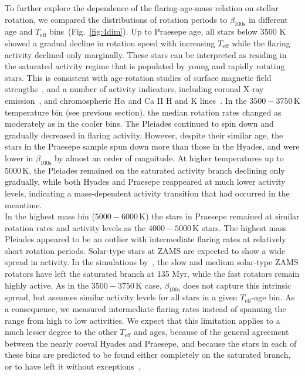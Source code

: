 \documentclass{aa}
\begin{document}
To further explore the dependence of the flaring-age-mass relation on stellar rotation, we compared the distributions of rotation periods to $\beta_\mathrm{100s}$ in different age and $T_\mathrm{eff}$ bins~(Fig.~\ref{fig:4dim}). Up to Praesepe age, all stars below 3500 K showed a gradual decline in rotation speed with increasing $T_\mathrm{eff}$ while the flaring activity declined only marginally. These stars can be interpreted as residing in the saturated activity regime that is populated by young and rapidly rotating stars. This is consistent with age-rotation studies of surface magnetic field strengths~\citep{vidotto2014}, and a number of activity indicators, including coronal X-ray emission~\citep{pizzolato2003,wright2011}, and chromospheric H$\alpha$ and Ca II H and K lines~\citep{mamajek2008,west2015,newton2017}. In the $3500-3750$\,K temperature bin (see previous section), the median rotation rates changed as moderately as in the cooler bins. The Pleiades continued to spin down and gradually decreased in flaring activity. However, despite their similar age, the stars in the Praesepe sample spun down more than those in the Hyades, and were lower in $\beta_\mathrm{100s}$ by almost an order of magnitude. At higher temperatures up to $5000$\,K, the Pleiades remained on the saturated activity branch declining only gradually, while both Hyades and Praesepe reappeared at much lower activity levels, indicating a mass-dependent activity transition that had occurred in the meantime.
\\
In the highest mass bin ($5000-6000$\,K) the stars in Praesepe remained at similar rotation rates and activity levels as the $4000-5000$\,K stars. The highest mass Pleiades appeared to be an outlier with intermediate flaring rates at relatively short rotation periods. Solar-type stars at ZAMS are expected to show a wide spread in activity. In the simulations by~\citet{johnstone2020}, the slow and medium solar-type ZAMS rotators have left the saturated branch at 135 Myr, while the fast rotators remain highly active. As in the $3500-3750$\,K case, $\beta_\mathrm{100s}$ does not capture this intrinsic spread, but assumes similar activity levels for all stars in a given $T_\mathrm{eff}$-age bin. As a consequence, we measured intermediate flaring rates instead of spanning the range from high to low activities. We expect that this limitation applies to a much lesser degree to the other $T_\mathrm{eff}$ and ages, because of the general agreement between the nearly coeval Hyades and Praesepe, and because the stars in each of these bins are predicted to be found either completely on the saturated branch, or to have left it without exceptions~\citep{johnstone2020}.
\end{document}
